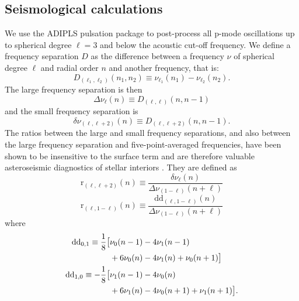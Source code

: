 \documentclass[manuscript]{aastex}
\begin{document}
\subsection{Seismological calculations}
\label{sec:seis}
We use the ADIPLS pulsation package \citep{2008Ap&SS.316..113C} to post-process all p-mode oscillations up to spherical degree $\ell=3$ and below the acoustic cut-off frequency. We define a frequency separation $D$ as the difference between a frequency $\nu$ of spherical degree $\ell$ and radial order $n$ and another frequency, that is:
\begin{equation} 
  D_{(\ell_1, \ell_2)}(n_1, n_2) \equiv \nu_{\ell_1}(n_1) - \nu_{\ell_2}(n_2).
\end{equation}
The large frequency separation is then
\begin{equation} 
  \Delta\nu_\ell(n) \equiv D_{(\ell, \ell)}(n, n-1)
\end{equation}
and the small frequency separation is
\begin{equation}
  \delta\nu_{(\ell, \ell+2)}(n) \equiv D_{(\ell, \ell+2)}(n, n-1).
\end{equation}
The ratios between the large and small frequency separations, and also between the large frequency separation and five-point-averaged frequencies, have been shown to be insensitive to the surface term and are therefore valuable asteroseismic diagnostics of stellar interiors \citep{2003A&A...411..215R}. They are defined as
\begin{equation} 
  \mathrm{r}_{(\ell,\ell+2)}(n) \equiv \frac{\delta\nu_\ell(n)}{\Delta\nu_{(1-\ell)}(n+\ell)}
\end{equation}
\begin{equation} 
  \mathrm{r}_{(\ell, 1-\ell)}(n) \equiv \frac{\mathrm{dd}_{(\ell,1-\ell)}(n)}{\Delta\nu_{(1-\ell)}(n+\ell)}
\end{equation}
where
\begin{align} 
  \mathrm{dd}_{0,1} \equiv \frac{1}{8} \big[&\nu_0(n-1) - 4\nu_1(n-1) \notag\\
                                 &+6\nu_0(n) - 4\nu_1(n) + \nu_0(n+1)\big]\\
  \mathrm{dd}_{1,0} \equiv -\frac{1}{8} \big[&\nu_1(n-1) - 4\nu_0(n) \notag\\
                                 &+6\nu_1(n) - 4\nu_0(n+1) + \nu_1(n+1)\big].
\end{align}
\end{document}

